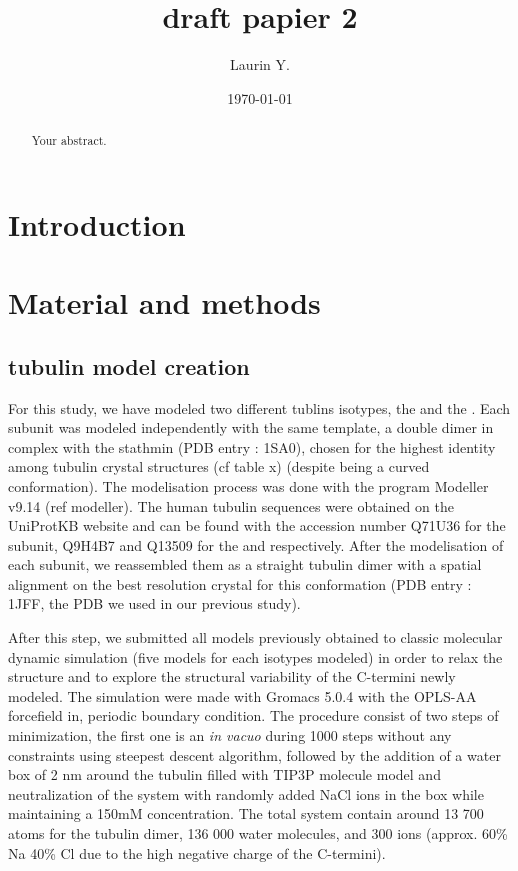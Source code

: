 \documentclass[a4paper]{article}
\title{draft papier 2}
\author{Laurin Y.}
\date{\today}
\begin{document}
\maketitle

\begin{abstract}
Your abstract.
\end{abstract}

\section{Introduction}

\section{Material and methods}

\subsection{tubulin model creation}


For this study, we have modeled two different tublins isotypes, the  and the . Each
subunit was modeled independently with the same template, a double dimer in complex with the stathmin
(PDB entry : 1SA0), chosen for the highest identity among tubulin crystal structures (cf table x) (despite
being a curved conformation). The modelisation process was done with the program Modeller v9.14 (ref modeller).
The human tubulin sequences were obtained on the UniProtKB website and can be found with the accession number
Q71U36 for the \alpha subunit, Q9H4B7 and Q13509 for the  and  respectively. After the modelisation
of each subunit, we reassembled them as a straight tubulin dimer with a spatial alignment on the best resolution
crystal for this conformation (PDB entry : 1JFF, the PDB we used in our previous study).

After this step, we submitted all models previously obtained to classic molecular dynamic simulation (five
models for each isotypes modeled) in order to relax the structure and to explore the structural variability
of the C-termini newly modeled. The simulation were made with Gromacs 5.0.4 with the OPLS-AA forcefield in,
periodic boundary condition. The procedure consist of two steps of minimization, the first one is an
\textit{in vacuo} during 1000 steps without any constraints using steepest descent algorithm, followed by the addition
of a water box of 2 nm around the tubulin filled with TIP3P molecule model and neutralization of the system
with randomly added NaCl ions in the box while maintaining a 150mM concentration. The total system contain around
13 700 atoms for the tubulin dimer, 136 000 water molecules, and 300 ions (approx. 60\% Na 40\% Cl due to the high
negative charge of the C-termini).
\end{document}

